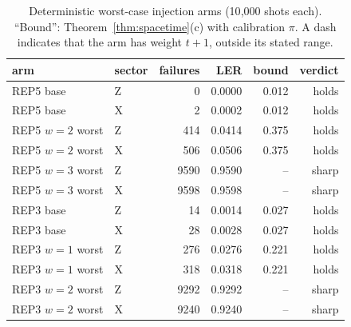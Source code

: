 \documentclass[pdflatex,sn-mathphys-num]{sn-jnl}
\theoremstyle{thmstyleone}
\theoremstyle{thmstyletwo}
\theoremstyle{thmstylethree}
\begin{document}
\begin{table}[htbp]\centering\small
\caption{Deterministic worst-case injection arms (10{,}000 shots each). ``Bound'': Theorem~\ref{thm:spacetime}(c) with calibration $\pi$. A dash indicates that the arm has weight $t+1$, outside its stated range.}
\label{tab:injdet}
\begin{tabular}{@{}llrrrr@{}}
\toprule
arm & sector & failures & LER & bound & verdict \\\midrule
REP5 base & Z & 0 & 0.0000 & 0.012 & holds \\
REP5 base & X & 2 & 0.0002 & 0.012 & holds \\
REP5 $w{=}2$ worst & Z & 414 & 0.0414 & 0.375 & holds \\
REP5 $w{=}2$ worst & X & 506 & 0.0506 & 0.375 & holds \\
REP5 $w{=}3$ worst & Z & 9590 & 0.9590 &--& sharp \\
REP5 $w{=}3$ worst & X & 9598 & 0.9598 &--& sharp \\
REP3 base & Z & 14 & 0.0014 & 0.027 & holds \\
REP3 base & X & 28 & 0.0028 & 0.027 & holds \\
REP3 $w{=}1$ worst & Z & 276 & 0.0276 & 0.221 & holds \\
REP3 $w{=}1$ worst & X & 318 & 0.0318 & 0.221 & holds \\
REP3 $w{=}2$ worst & Z & 9292 & 0.9292 &--& sharp \\
REP3 $w{=}2$ worst & X & 9240 & 0.9240 &--& sharp \\\bottomrule
\end{tabular}
\end{table}
\end{document}
